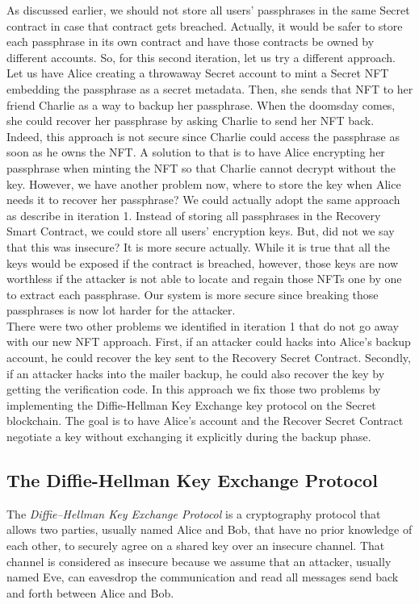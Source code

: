\documentclass[12pt]{article}
\begin{document}
As discussed earlier, we should not store all users' passphrases in the same Secret contract in case that contract gets breached. Actually, it would be safer to store each passphrase in its own contract and have those contracts be owned by different accounts. So, for this second iteration, let us try a different approach. Let us have Alice creating a throwaway Secret account to mint a Secret NFT embedding the passphrase as a secret metadata. Then, she sends that NFT to her friend Charlie as a way to backup her passphrase. When the doomsday comes, she could recover her passphrase by asking Charlie to send her NFT back. Indeed, this approach is not secure since Charlie could access the passphrase as soon as he owns the NFT. A solution to that is to have Alice encrypting her passphrase when minting the NFT so that Charlie cannot decrypt without the key. However, we have another problem now, where to store the key when Alice needs it to recover her passphrase? We could actually adopt the same approach as describe in iteration 1. Instead of storing all passphrases in the Recovery Smart Contract, we could store all users' encryption keys. But, did not we say that this was insecure? It is more secure actually. While it is true that all the keys would be exposed if the contract is breached, however, those keys are now worthless if the attacker is not able to locate and regain those NFTs one by one to extract each passphrase. Our system is more secure since breaking those passphrases is now lot harder for the attacker. \\

There were two other problems we identified in iteration 1 that do not go away with our new NFT approach. First, if an attacker could hacks into Alice's backup account, he could recover the key sent to the Recovery Secret Contract. Secondly, if an attacker hacks into the mailer backup, he could also recover the key by getting the verification code. In this approach we fix those two problems by implementing the Diffie-Hellman Key Exchange key protocol on the Secret blockchain. The goal is to have Alice's account and the Recover Secret Contract negotiate a key without exchanging it explicitly during the backup phase.

\subsection{The Diffie-Hellman Key Exchange Protocol}

The {\em Diffie–Hellman Key Exchange Protocol} is a cryptography protocol that allows two parties, usually named Alice and Bob, that have no prior knowledge of each other, to securely agree on a shared key over an insecure channel. That channel is considered as insecure because we assume that an attacker, usually named Eve, can eavesdrop the communication and read all messages send back and forth between Alice and Bob. \\
\end{document}
